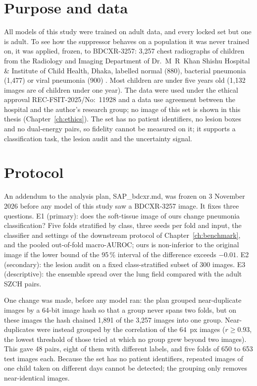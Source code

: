 \label{sec:bdcxr}
\section{Purpose and data}
All models of this study were trained on adult data, and every locked set but one is adult. To see how the suppressor behaves on a population
it was never trained on, it was applied, frozen, to BDCXR-3257: 3,257 chest radiographs of children from the Radiology and Imaging Department of
Dr.~M~R~Khan Shishu Hospital \& Institute of Child Health, Dhaka, labelled normal (880), bacterial pneumonia (1,477) or viral pneumonia (900)
\citep{durjoy2026bdcxr}. Most children are under five years old (1,132 images are of children under one year). The data were used under the
ethical approval REC-FSIT-2025/No:~11928 and a data use agreement between the hospital and the author's research group; no image of this set is
shown in this thesis (Chapter~\ref{ch:ethics}). The set has no patient identifiers, no lesion boxes and no dual-energy pairs, so fidelity
cannot be measured on it; it supports a classification task, the lesion audit and the uncertainty signal.

\section{Protocol}
An addendum to the analysis plan, SAP\_bdcxr.md, was frozen on 3 November 2026 before any model of this study saw a BDCXR-3257 image. It
fixes three questions. E1 (primary): does the soft-tissue image of ours change pneumonia classification? Five folds stratified by class, three
seeds per fold and input, the classifier and settings of the downstream protocol of Chapter~\ref{ch:benchmark}, and the pooled out-of-fold
macro-AUROC; ours is non-inferior to the original image if the lower bound of the 95\,\% interval of the difference exceeds $-0.01$. E2
(secondary): the lesion audit on a fixed class-stratified subset of 300 images. E3 (descriptive): the ensemble spread over the lung field
compared with the adult SZCH pairs.

One change was made, before any model ran: the plan grouped near-duplicate images by a 64-bit image hash so that a group never spans two folds,
but on these images the hash chained 1,891 of the 3,257 images into one group. Near-duplicates were instead grouped by the correlation of the
$64$~px images ($r\ge0.93$, the lowest threshold of those tried at which no group grew beyond two images). This gave 48 pairs, eight of them
with different labels, and five folds of 650 to 653 test images each. Because the set has no patient identifiers, repeated images of one
child taken on different days cannot be detected; the grouping only removes near-identical images.

